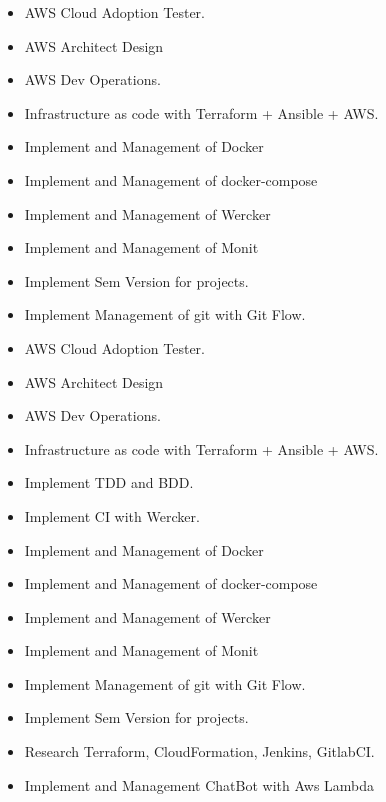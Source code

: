 \documentclass[10pt,a4paper]{altacv}
\begin{document}
\divider

\begin{itemize}
\item AWS Cloud Adoption Tester.
  \item AWS Architect Design
  \item AWS Dev Operations.
  \item Infrastructure as code with Terraform + Ansible + AWS.
  \item Implement and Management of Docker
  \item Implement and Management of docker-compose
  \item Implement and Management of Wercker
  \item Implement and Management of Monit
  \item Implement Sem Version for projects.
  \item Implement Management of git with Git Flow.
\end{itemize}

\divider

\begin{itemize}
  \item AWS Cloud Adoption Tester.
  \item AWS Architect Design
  \item AWS Dev Operations.
  \item Infrastructure as code with Terraform + Ansible + AWS.
  \item Implement TDD and BDD.
  \item Implement CI with Wercker.
  \item Implement and Management of Docker
  \item Implement and Management of docker-compose
  \item Implement and Management of Wercker
  \item Implement and Management of Monit
  \item Implement Management of git with Git Flow.
  \item Implement Sem Version for projects.
  \item Research Terraform, CloudFormation, Jenkins, GitlabCI.
  \item Implement and Management ChatBot with Aws Lambda
\end{itemize}

\divider
\end{document}
